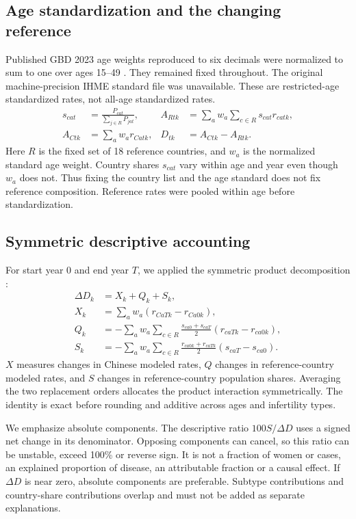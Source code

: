 \documentclass[11pt,a4paper]{article}
\begin{document}
\subsection{Age standardization and the changing reference}
Published GBD 2023 age weights reproduced to six decimals were normalized to sum to one over ages 15--49 \cite{chen}. They remained fixed throughout. The original machine-precision IHME standard file was unavailable. These are restricted-age standardized rates, not all-age standardized rates.
\begin{align}
 s_{cat}&=\frac{P_{cat}}{\sum_{j\in R}P_{jat}}, &
 A_{Rtk}&=\sum_a w_a\sum_{c\in R}s_{cat}r_{catk},\\
 A_{Ctk}&=\sum_a w_ar_{Catk}, &D_{tk}&=A_{Ctk}-A_{Rtk}.
\end{align}
Here $R$ is the fixed set of 18 reference countries, and $w_a$ is the normalized standard age weight. Country shares $s_{cat}$ vary within age and year even though $w_a$ does not. Thus fixing the country list and the age standard does not fix reference composition. Reference rates were pooled within age before standardization.

\subsection{Symmetric descriptive accounting}
For start year 0 and end year $T$, we applied the symmetric product decomposition \cite{kitagawa}:
\begin{align}
 \Delta D_k &=X_k+Q_k+S_k,\\
 X_k&=\sum_a w_a(r_{CaTk}-r_{Ca0k}),\\
 Q_k&=-\sum_a w_a\sum_{c\in R}\frac{s_{ca0}+s_{caT}}{2}(r_{caTk}-r_{ca0k}),\\
 S_k&=-\sum_a w_a\sum_{c\in R}\frac{r_{ca0k}+r_{caTk}}{2}(s_{caT}-s_{ca0}).
\end{align}
$X$ measures changes in Chinese modeled rates, $Q$ changes in reference-country modeled rates, and $S$ changes in reference-country population shares. Averaging the two replacement orders allocates the product interaction symmetrically. The identity is exact before rounding and additive across ages and infertility types.

We emphasize absolute components. The descriptive ratio $100S/\Delta D$ uses a signed net change in its denominator. Opposing components can cancel, so this ratio can be unstable, exceed 100\% or reverse sign. It is not a fraction of women or cases, an explained proportion of disease, an attributable fraction or a causal effect. If $\Delta D$ is near zero, absolute components are preferable. Subtype contributions and country-share contributions overlap and must not be added as separate explanations.
\end{document}
